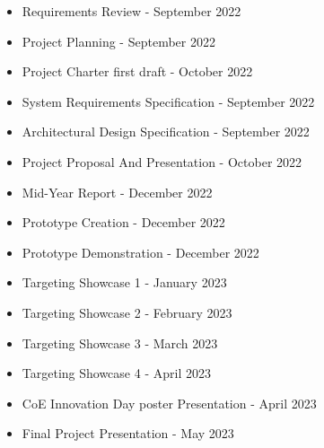 

\begin{itemize}
  \item Requirements Review - September 2022
  \item Project Planning - September 2022
  \item Project Charter first draft - October 2022
  \item System Requirements Specification - September 2022
  \item Architectural Design Specification - September 2022
  \item Project Proposal And Presentation - October 2022
  \item Mid-Year Report - December 2022
  \item Prototype Creation - December 2022
  \item Prototype Demonstration - December 2022
  \item Targeting Showcase 1 - January 2023
  \item Targeting Showcase 2 - February 2023
  \item Targeting Showcase 3 - March 2023
  \item Targeting Showcase 4 - April 2023
  \item CoE Innovation Day poster Presentation - April 2023
  \item Final Project Presentation - May 2023 
\end{itemize}
